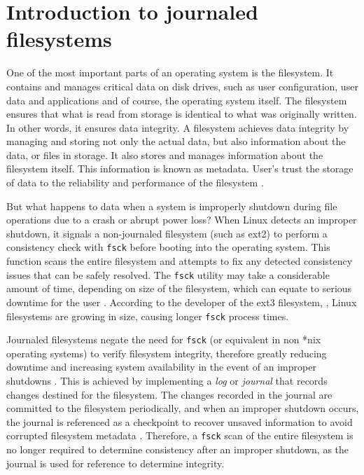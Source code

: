\section{Introduction to journaled filesystems}

One of the most important parts of an operating system is the filesystem. It contains and manages critical data on disk drives, such as user configuration, user data and applications and of course, the operating system itself. The filesystem ensures that what is read from storage is identical to what was originally written. In other words, it ensures data integrity. A filesystem achieves data integrity by managing and storing not only the actual data, but also information about the data, or files in storage. It also stores and manages information about the filesystem itself. This information is known as metadata. User's trust the storage of data to the reliability and performance of the filesystem \citep{Best2002}.

But what happens to data when a system is improperly shutdown during file operations due to a crash or abrupt power loss? When Linux detects an improper shutdown, it signals a non-journaled filesystem (such as ext2) to perform a consistency check with \texttt{fsck} before booting into the operating system. This function scans the entire filesystem and attempts to fix any detected consistency issues that can be safely resolved. The \texttt{fsck} utility may take a considerable amount of time, depending on size of the filesystem, which can equate to serious downtime for the user \citep{Jones2008}. According to the developer of the ext3 filesystem, \citet{Tweedie2000}, Linux filesystems are growing in size, causing longer \texttt{fsck} process times.

Journaled filesystems negate the need for \texttt{fsck} (or equivalent in non *nix operating systems) to verify filesystem integrity, therefore greatly reducing downtime and increasing system availability in the event of an improper shutdowns \citep{Best2002, Bost2012, Jones2008, Prabhakaran2005a, Tweedie1998, Tweedie2000}. This is achieved by implementing a \emph{log} or \emph{journal} that records changes destined for the filesystem. The changes recorded in the journal are committed to the filesystem periodically, and when an improper shutdown occurs, the journal is referenced as a checkpoint to recover unsaved information to avoid corrupted filesystem metadata \citep{Jones2008}. Therefore, a \texttt{fsck} scan of the entire filesystem is no longer required to determine consistency after an improper shutdown, as the journal is used for reference to determine integrity.